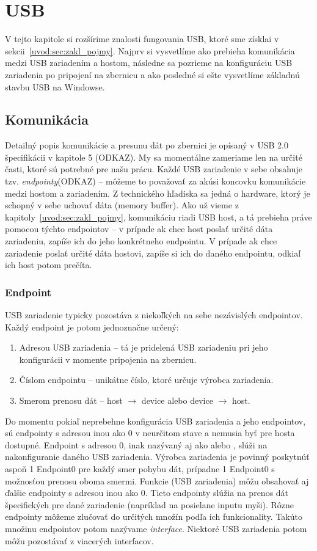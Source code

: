 \chapter{USB}
V tejto kapitole si rozšírime znalosti fungovania USB, ktoré sme získlai v sekcii~\ref{uvod:sec:zakl_pojmy}. Najprv si vysvetlíme ako prebieha komunikácia medzi USB zariadením a hostom, následne sa pozrieme na konfiguráciu USB zariadenia po pripojení na zbernicu a ako posledné si ešte vysvetlíme základnú stavbu USB na Windowse.

\section{Komunikácia}
Detailný popis komunikácie a presunu dát po zbernici je opísaný v USB 2.0 špecifikácii v kapitole 5 (ODKAZ). My sa momentálne zameriame len na určité časti, ktoré sú potrebné pre našu prácu. Každé USB zariadenie v sebe obsahuje tzv. \textit{endpointy}(ODKAZ) -- môžeme to považovať za akúsi koncovku komunikácie medzi hostom a zariadením. Z technického hľadiska sa jedná o hardware, ktorý je schopný v sebe uchovať dáta (memory buffer). Ako už vieme z kapitoly~\ref{uvod:sec:zakl_pojmy}, komunikáciu riadi USB host, a tá prebieha práve pomocou týchto endpointov -- v prípade ak chce host poslať určité dáta zariadeniu, zapíše ich do jeho konkrétneho endpointu. V prípade ak chce zariadenie poslať určité dáta hostovi, zapíše si ich do daného endpointu, odkiaľ ich host potom prečíta.

\subsection{Endpoint}
USB zariadenie typicky pozostáva z niekoľkých na sebe nezávislých endpointov. Každý endpoint je potom jednoznačne určený:
\begin{enumerate}
\item Adresou USB zariadenia -- tá je pridelená USB zariadeniu pri jeho konfigurácii v momente pripojenia na zbernicu.
\item Číslom endpointu -- unikátne číslo, ktoré určuje výrobca zariadenia.
\item Smerom prenosu dát -- host $\longrightarrow$ device alebo device $\longrightarrow$ host.
\end{enumerate}

Do momentu pokiaľ neprebehne konfigurácia USB zariadenia a jeho endpointov, sú endpointy s adresou inou ako 0 v neurčitom stave a nemusia byť pre hosta dostupné. Endpoint s adresou 0, inak nazývaný aj ako  alebo , slúži na nakonfiguranie daného USB zariadenia. Výrobca zariadenia je povinný poskytnúť aspoň 1 Endpoint0 pre každý smer pohybu dát, prípadne 1 Endpoint0 s možnosťou prenosu oboma smermi. Funkcie (USB zariadenia) môžu obsahovať aj ďalšie endpointy s adresou inou ako 0. Tieto endpointy slúžia na prenos dát špecifických pre dané zariadenie (napríklad na posielane inputu myši). Rôzne endpointy môžeme zlučovať do určitých množín podľa ich funkcionality. Takúto množinu endpointov potom nazývame \textit{interface}. Niektoré USB zariadenia potom môžu pozostávať z viacerých interfacov.

